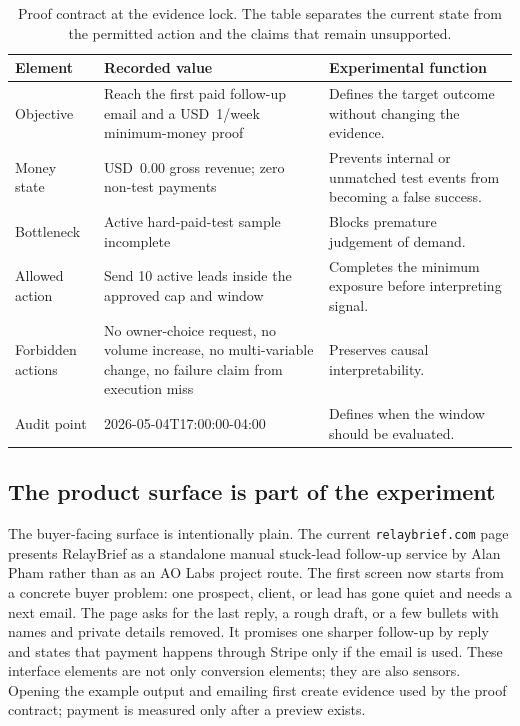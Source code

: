 \documentclass[12pt,letterpaper]{article}
\begin{document}
\begin{table}[tbp]
\centering
\small
\caption{Proof contract at the evidence lock. The table separates the current state from the permitted action and the claims that remain unsupported.}
\label{tab:proof_contract}
\begin{tabularx}{\textwidth}{L{0.22\textwidth}Y Y}
\toprule
{}
\textbf{Element} & \textbf{Recorded value} & \textbf{Experimental function} \\
\midrule
Objective & Reach the first paid follow-up email and a USD~1/week minimum-money proof & Defines the target outcome without changing the evidence. \\
Money state & USD~0.00 gross revenue; zero non-test payments & Prevents internal or unmatched test events from becoming a false success. \\
Bottleneck & Active hard-paid-test sample incomplete & Blocks premature judgement of demand. \\
Allowed action & Send 10 active leads inside the approved cap and window & Completes the minimum exposure before interpreting signal. \\
Forbidden actions & No owner-choice request, no volume increase, no multi-variable change, no failure claim from execution miss & Preserves causal interpretability. \\
Audit point & 2026-05-04T17:00:00-04:00 & Defines when the window should be evaluated. \\
\bottomrule
\end{tabularx}
\end{table}

\subsection{The product surface is part of the experiment}

The buyer-facing surface is intentionally plain. The current \texttt{relaybrief.com} page presents RelayBrief as a standalone manual stuck-lead follow-up service by Alan Pham rather than as an AO Labs project route. The first screen now starts from a concrete buyer problem: one prospect, client, or lead has gone quiet and needs a next email. The page asks for the last reply, a rough draft, or a few bullets with names and private details removed. It promises one sharper follow-up by reply and states that payment happens through Stripe only if the email is used. These interface elements are not only conversion elements; they are also sensors. Opening the example output and emailing first create evidence used by the proof contract; payment is measured only after a preview exists.
\end{document}
